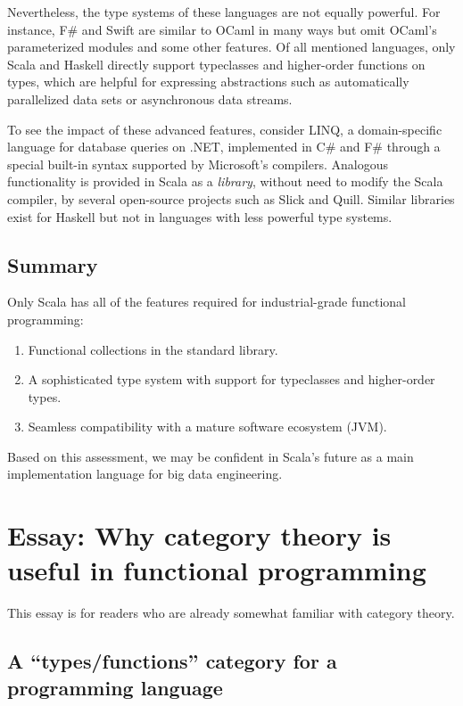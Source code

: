 Nevertheless, the type systems of these languages are not equally
powerful. For instance, F\# and Swift are similar to OCaml in many
ways but omit OCaml\textsf{'}s parameterized modules and some other features.
Of all mentioned languages, only Scala and Haskell directly support
typeclasses and higher-order functions on types, which are helpful
for expressing abstractions such as automatically parallelized data
sets or asynchronous data streams.

To see the impact of these advanced features, consider LINQ, a domain-specific
language for database queries on .NET, implemented in C\# and F\#
through a special built-in syntax supported by Microsoft\textsf{'}s compilers.
Analogous functionality is provided in Scala as a \emph{library},
without need to modify the Scala compiler, by several open-source
projects such as Slick and Quill. Similar libraries exist for Haskell
\textemdash{} but not in languages with less powerful type systems.

\section{Summary}

Only Scala has all of the features required for industrial-grade functional
programming:
\begin{enumerate}
\item Functional collections in the standard library.
\item A sophisticated type system with support for typeclasses and higher-order
types.
\item Seamless compatibility with a mature software ecosystem (JVM).
\end{enumerate}
Based on this assessment, we may be confident in Scala\textsf{'}s future as
a main implementation language for big data engineering.

\chapter{Essay: Why category theory is useful in functional programming}

This essay is for
readers who are already somewhat familiar with category theory.

\section{A \textsf{``}types/functions\textsf{''} category for a programming language}


